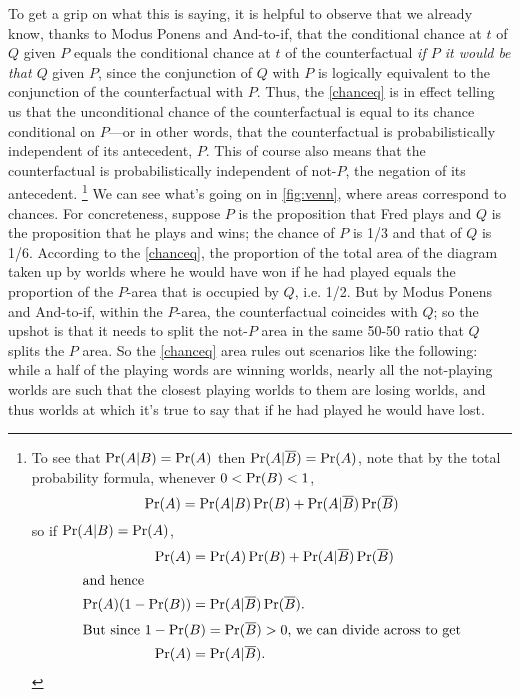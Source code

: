 \documentclass[If.tex]{subfiles}
\begin{document}
To get a grip on what this is saying, it is helpful to observe that we already know, thanks to Modus Ponens and And-to-if, that the conditional chance at $t$ of $Q$ given $P$ equals the conditional chance at $t$ of the counterfactual \emph{if $P$ it would be that $Q$} given $P$, since the conjunction of $Q$ with $P$ is logically equivalent to the conjunction of the counterfactual with $P$.  Thus, the \ref{chanceq} is in effect telling us that the unconditional chance of the counterfactual is equal to its chance conditional on $P$---or in other words, that the counterfactual is probabilistically independent of its antecedent, $P$.  This of course also means that the counterfactual is probabilistically independent of not-$P$, the negation of its antecedent.%
\footnote{To see that $\operatorname{Pr}(A|B) = \operatorname{Pr}(A)$ then $\operatorname{Pr}(A|\overline{B}) = \operatorname{Pr}(A)$, note that by the total probability formula, whenever $0 < \operatorname{Pr}(B) < 1$, 
	\begin{equation*}
		\operatorname{Pr}(A) = \operatorname{Pr}(A|B)\operatorname{Pr}(B) + \operatorname{Pr}(A|\overline{B})\operatorname{Pr}(\overline{B})
	\end{equation*}
	so if $\operatorname{Pr}(A|B) = \operatorname{Pr}(A)$,
	\begin{align*}
		\operatorname{Pr}(A) &= \operatorname{Pr}(A)\operatorname{Pr}(B) + \operatorname{Pr}(A|\overline{B})\operatorname{Pr}(\overline{B})
		\\\intertext{and hence}
		\operatorname{Pr}(A)(1 - \operatorname{Pr}(B)) &= \operatorname{Pr}(A|\overline{B})\operatorname{Pr}(\overline{B}).
		\\\intertext{But since $1-\operatorname{Pr}(B) = \operatorname{Pr}(\overline{B}) > 0$, we can divide across to get}
		\operatorname{Pr}(A) &= \operatorname{Pr}(A|\overline{B}).
	\end{align*}
	}
We can see what's going on in \autoref{fig:venn}, where areas correspond to chances.  For concreteness, suppose $P$ is the proposition that Fred plays and $Q$ is the proposition that he plays and wins; the chance of $P$ is 1/3 and that of $Q$ is 1/6.  According to the \ref{chanceq}, the proportion of the total area of the diagram taken up by worlds where he would have won if he had played equals the proportion of the $P$-area that is occupied by $Q$, i.e. 1/2.  But by Modus Ponens and And-to-if, within the $P$-area, the counterfactual coincides with $Q$; so the upshot is that it needs to split the not-$P$ area in the same 50-50 ratio that $Q$ splits the $P$ area.  So the \ref{chanceq} area rules out scenarios like the following: while a half of the playing words are winning worlds, nearly all the not-playing worlds are such that the closest playing worlds to them are losing worlds, and thus worlds at which it's true to say that if he had played he would have lost.  
\end{document}
